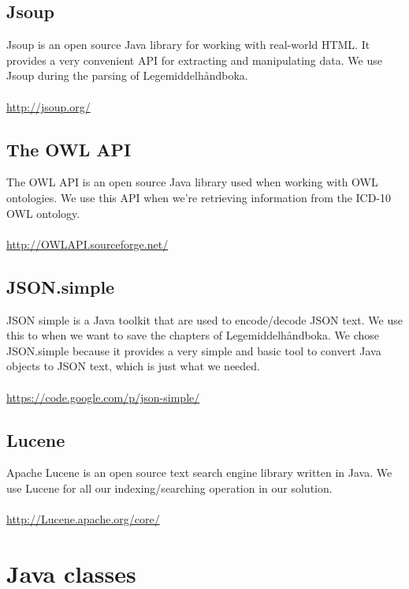 \subsection*{Jsoup}
Jsoup is an open source Java library for working with real-world HTML. It
provides a very convenient API for extracting and manipulating data. We use
Jsoup during the parsing of Legemiddelhåndboka.\\\\
\url{http://jsoup.org/}

\subsection*{The OWL API}
The OWL API is an open source Java library used when working with OWL
ontologies. We use this API when we’re retrieving information from the ICD-10
OWL ontology.\\\\
\url{http://OWLAPI.sourceforge.net/}

\subsection*{JSON.simple}
JSON simple is a Java toolkit that are used to encode/decode JSON text. We use
this to when we want to save the chapters of Legemiddelhåndboka. We chose
JSON.simple because it provides a very simple and basic tool to convert Java
objects to JSON text, which is just what we needed.\\\\
\url{https://code.google.com/p/json-simple/}

\subsection*{Lucene}
Apache Lucene is an open source text search engine library written in Java. We
use Lucene for all our indexing/searching operation in our solution.\\\\
\url{http://Lucene.apache.org/core/}


\section{Java classes}
\label{sec:java-classes}

